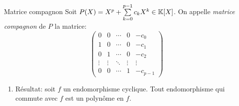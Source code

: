 \begin{box_titre}{Matrice compagnon}
    Soit $P(X) = X^p + \sum\limits_{k=0}^{p-1} c_kX^k \in \mathbb{K}[X]$. On appelle \emph{matrice compagnon} de $P$ la matrice:
    $$
    \begin{pmatrix}
        0 & 0 & \cdots & 0 & -c_0 \\
        1 & 0 & \cdots & 0 & -c_1 \\
        0 & 1 & \cdots & 0 & -c_2 \\
        \vdots & \vdots & \ddots & \vdots & \vdots \\
        0 & 0 & \cdots & 1 & -c_{p-1}
    \end{pmatrix}
    $$
\end{box_titre}


\begin{enumerate}
    \item Résultat: soit $f$ un endomorphisme cyclique. Tout endomorphisme qui commute avec $f$ est un polynôme en $f$.
\end{enumerate}